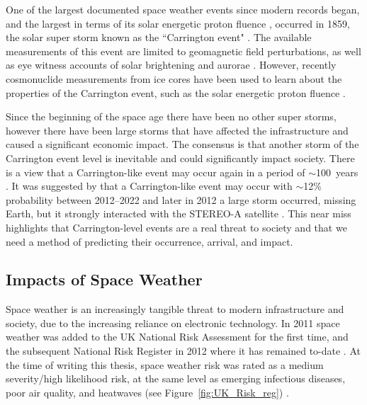 One of the largest documented space weather events since modern records began, and the largest in terms of its solar energetic proton fluence \citep{cliver_solar_2004}, occurred in 1859, the solar super storm known as the ``Carrington event" \citep{carrington_description_1859}. The available measurements of this event are limited to geomagnetic field perturbations, as well as eye witness accounts of solar brightening and aurorae \citep{cannon_extreme_2013}. However, recently cosmonuclide measurements from ice cores have been used to learn about the properties of the Carrington event, such as the solar energetic proton fluence \citep{riley_probability_2012}.%

Since the beginning of the space age there have been no other super storms, however there have been large storms that have affected the infrastructure and caused a significant economic impact. The consensus is that another storm of the Carrington event level is inevitable and could significantly impact society. There is a view that a Carrington-like event may occur again in a period of $\sim$100~years \citep{cannon_extreme_2013,elvidge_using_2018,love_some_2020, love_extreme-event_2021}. It was suggested by \cite{riley_probability_2012} that a Carrington-like event may occur with $\sim$12\% probability between 2012--2022 and later in 2012 a large storm occurred, missing Earth, but it strongly interacted with the STEREO-A satellite \citep{russell_very_2013}. This near miss highlights that Carrington-level events are a real threat to society and that we need a method of predicting their occurrence, arrival, and impact.



\subsection{Impacts of Space Weather}
\label{sw_impacts}
Space weather is an increasingly tangible threat to modern infrastructure and society, due to the increasing reliance on electronic technology. In 2011 space weather was added to the UK National Risk Assessment for the first time, and the subsequent National Risk Register in 2012 \citep{bis_space_2015} where it has remained to-date \citep{hm_government_national_2020}. At the time of writing this thesis, space weather risk was rated as a medium severity/high likelihood risk, at the same level as emerging infectious diseases, poor air quality, and heatwaves (see Figure~\ref{fig:UK_Risk_reg}) \citep{cabinet_office_national_2017}.

